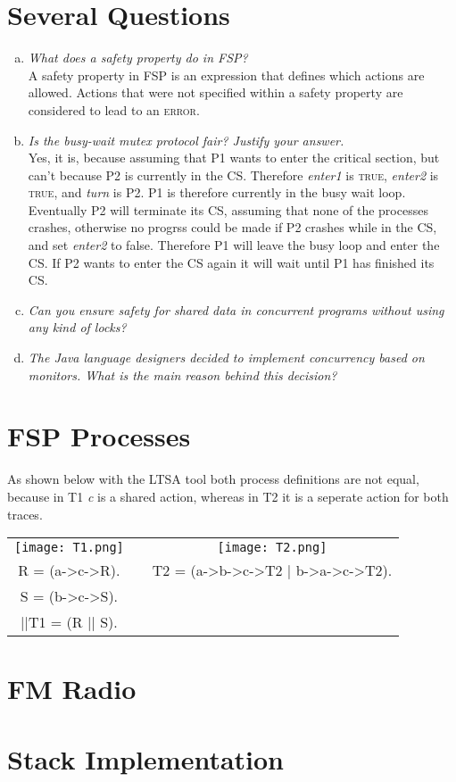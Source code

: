 \documentclass{report}
\begin{document}
	\section{Several Questions}
	\startsection
		\begin{enumerate}[a)]
			\item \textit{What does a safety property do in FSP?} \\
			A safety property in FSP is an expression that defines which actions are allowed. Actions that were not specified within a safety property are considered to lead to an \textsc{error}.
			\item \textit{Is the busy-wait mutex protocol fair? Justify your answer.} \\
			Yes, it is, because assuming that P1 wants to enter the critical section, but can't because P2 is currently in the CS. Therefore \textit{enter1} is \textsc{true}, \textit{enter2} is \textsc{true}, and \textit{turn} is P2. P1 is therefore currently in the busy wait loop. Eventually P2 will terminate its CS, assuming that none of the processes crashes, otherwise no progrss could be made if P2 crashes while in the CS, and set \textit{enter2} to false. Therefore P1 will leave the busy loop and enter the CS. If P2 wants to enter the CS again it will wait until P1 has finished its CS.
			\item \textit{Can you ensure safety for shared data in concurrent programs without using any kind of locks?} \\
			\item \textit{The Java language designers decided to implement concurrency based on monitors. What is the main reason behind this decision?} \\
		\end{enumerate}
	\closesection
	
	\section{FSP Processes}
	\startsection
		As shown below with the LTSA tool both process definitions are not equal, because in T1 \textit{c} is a shared action, whereas in T2 it is a seperate action for both traces. \\
		\begin{tabular}{ccc}
			\texttt{[image: T1.png]} && \texttt{[image: T2.png]} \\
			R = (a->c->R). && T2 = (a->b->c->T2 | b->a->c->T2). \\
			S = (b->c->S). \\
			||T1 = (R || S).
		\end{tabular}
	\closesection
	
	\section{FM Radio}
	\startsection
	\closesection
	
	\section{Stack Implementation}
	\startsection
	\closesection
\end{document}
